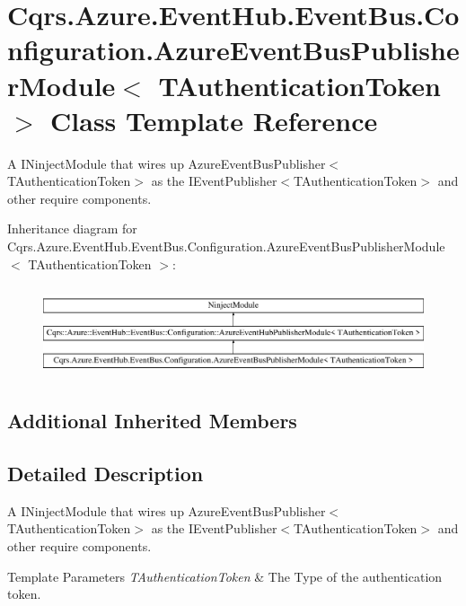\hypertarget{classCqrs_1_1Azure_1_1EventHub_1_1EventBus_1_1Configuration_1_1AzureEventBusPublisherModule}{}\section{Cqrs.\+Azure.\+Event\+Hub.\+Event\+Bus.\+Configuration.\+Azure\+Event\+Bus\+Publisher\+Module$<$ T\+Authentication\+Token $>$ Class Template Reference}
\label{classCqrs_1_1Azure_1_1EventHub_1_1EventBus_1_1Configuration_1_1AzureEventBusPublisherModule}


A I\+Ninject\+Module that wires up Azure\+Event\+Bus\+Publisher$<$\+T\+Authentication\+Token$>$ as the I\+Event\+Publisher$<$\+T\+Authentication\+Token$>$ and other require components.  


Inheritance diagram for Cqrs.\+Azure.\+Event\+Hub.\+Event\+Bus.\+Configuration.\+Azure\+Event\+Bus\+Publisher\+Module$<$ T\+Authentication\+Token $>$\+:\begin{figure}[H]
\begin{center}
\leavevmode
\includegraphics[height=2.696629cm]{classCqrs_1_1Azure_1_1EventHub_1_1EventBus_1_1Configuration_1_1AzureEventBusPublisherModule}
\end{center}
\end{figure}
\subsection*{Additional Inherited Members}


\subsection{Detailed Description}
A I\+Ninject\+Module that wires up Azure\+Event\+Bus\+Publisher$<$\+T\+Authentication\+Token$>$ as the I\+Event\+Publisher$<$\+T\+Authentication\+Token$>$ and other require components. 


\begin{DoxyTemplParams}{Template Parameters}
{\em T\+Authentication\+Token} & The Type of the authentication token.\\
\hline
\end{DoxyTemplParams}

